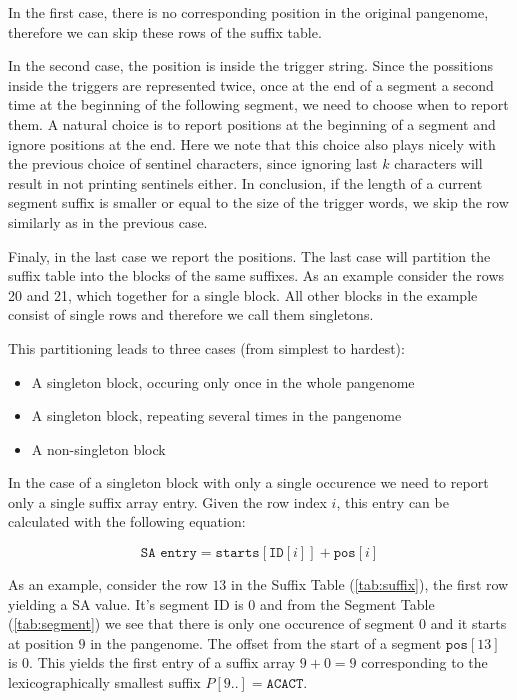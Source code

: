 In the first case, there is no corresponding position in the original pangenome,
therefore we can skip these rows of the suffix table.

In the second case, the position is inside the trigger string.
Since the possitions inside the triggers are represented twice, once at the end
of a segment a second time at the beginning of the following segment, we need
to choose when to report them.
A natural choice is to report positions at the beginning of a segment and ignore
positions at the end.
Here we note that this choice also plays nicely with the previous choice of sentinel
characters, since ignoring last $k$ characters will result in not printing
sentinels either.
In conclusion, if the length of a current segment suffix is smaller or equal to
the size of the trigger words, we skip the row similarly as in the previous case.

Finaly, in the last case we report the positions.
The last case will partition the suffix table into the blocks of the same suffixes.
As an example consider the rows 20 and 21, which together for a single block.
All other blocks in the example consist of single rows and therefore we call them singletons.

This partitioning leads to three cases (from simplest to hardest):
\begin{itemize}
    \item A singleton block, occuring only once in the whole pangenome
    \item A singleton block, repeating several times in the pangenome
    \item A non-singleton block
\end{itemize}

In the case of a singleton block with only a single occurence we need to report only a single suffix array entry.
Given the row index $i$, this entry can be calculated with the following equation:

\begin{equation}
    \label{eq:sa_entry}
    \texttt{SA entry} = \texttt{starts}[\texttt{ID}[i]] + \texttt{pos}[i]
\end{equation}

As an example, consider the row $13$ in the Suffix Table (\ref{tab:suffix}), the first row yielding a SA value.
It's segment ID is $0$ and from the Segment Table (\ref{tab:segment}) we see that there is only one occurence of segment $0$ and it starts at position $9$ in the pangenome.
The offset from the start of a segment $\texttt{pos}[13]$ is $0$.
This yields the first entry of a suffix array $9 + 0 = 9$ corresponding to the lexicographically smallest suffix $P[9..] = \texttt{ACACT}$.

